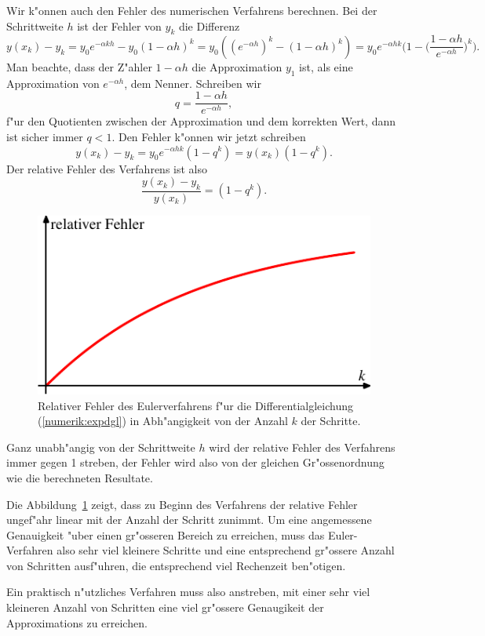 Wir k"onnen auch den Fehler des numerischen Verfahrens berechnen.
Bei der Schrittweite $h$ ist der Fehler von $y_k$ die Differenz
\[
y(x_k)-y_k
=
y_0e^{-\alpha kh}-y_0(1-\alpha h)^k
=
y_0((e^{-\alpha h})^k - (1-\alpha h)^k)
=
y_0e^{-\alpha hk}\biggl(
1-\biggl(\frac{1-\alpha h}{e^{-\alpha h}}\biggr)^k
\biggr).
\]
Man beachte, dass der Z"ahler $1-\alpha h$ die Approximation
$y_1$ ist, als eine Approximation von $e^{-\alpha h}$, dem Nenner.
Schreiben wir
\[
q=\frac{1-\alpha h}{e^{-\alpha h}},
\]
f"ur den Quotienten zwischen der Approximation und dem korrekten Wert,
dann ist sicher immer $q<1$.
Den Fehler k"onnen wir jetzt schreiben
\[
y(x_k)-y_k = y_0e^{-\alpha hk}(1-q^k) = y(x_k)(1-q^k).
\]
Der relative Fehler des Verfahrens ist also
\[
\frac{y(x_k)-y_k}{y(x_k)}=(1-q^k).
\]
\begin{figure}
\centering
\includegraphics{chapters/images/numerik-3.pdf}
\caption{Relativer Fehler des Eulerverfahrens f"ur die Differentialgleichung
(\ref{numerik:expdgl}) in Abh"angigkeit von der Anzahl $k$ der Schritte.
\label{numerik:relfehler}}
\end{figure}%
Ganz unabh"angig von der Schrittweite $h$ wird der relative Fehler
des Verfahrens immer gegen 1 streben, der Fehler wird also von der
gleichen Gr"ossenordnung wie die berechneten Resultate.

Die Abbildung~\ref{numerik:relfehler} zeigt, dass zu Beginn des Verfahrens
der relative Fehler ungef"ahr linear mit der Anzahl der Schritt zunimmt.
Um eine angemessene Genauigkeit "uber einen gr"osseren Bereich
zu erreichen, muss das Euler-Verfahren also sehr viel kleinere Schritte
und eine entsprechend gr"ossere Anzahl von Schritten ausf"uhren,
die entsprechend viel Rechenzeit ben"otigen.

Ein praktisch n"utzliches Verfahren muss also anstreben, mit einer
sehr viel kleineren Anzahl von Schritten eine viel gr"ossere Genaugikeit
der Approximations zu erreichen.

